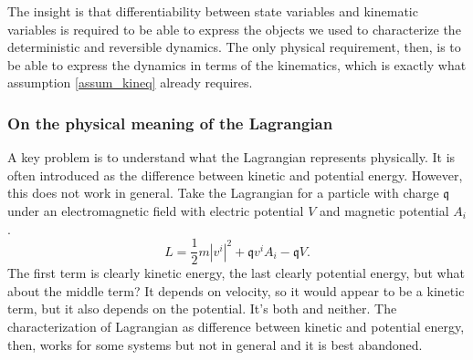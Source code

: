 The insight is that differentiability between state variables and kinematic variables is required to be able to express the objects we used to characterize the deterministic and reversible dynamics. The only physical requirement, then, is to be able to express the dynamics in terms of the kinematics, which is exactly what assumption \ref{assum_kineq} already requires.

\subsubsection{On the physical meaning of the Lagrangian}

A key problem is to understand what the Lagrangian represents physically. It is often introduced as the difference between kinetic and potential energy. However, this does not work in general. Take the Lagrangian for a particle with charge $\mathfrak{q}$ under an electromagnetic field with electric potential $V$ and magnetic potential $A_i$.
\begin{equation}
	L = \frac{1}{2} m |v^i|^2 + \mathfrak{q} v^i A_i -\mathfrak{q} V.
\end{equation}
The first term is clearly kinetic energy, the last clearly potential energy, but what about the middle term? It depends on velocity, so it would appear to be a kinetic term, but it also depends on the potential. It's both and neither. The characterization of Lagrangian as difference between kinetic and potential energy, then, works for some systems but not in general and it is best abandoned.

